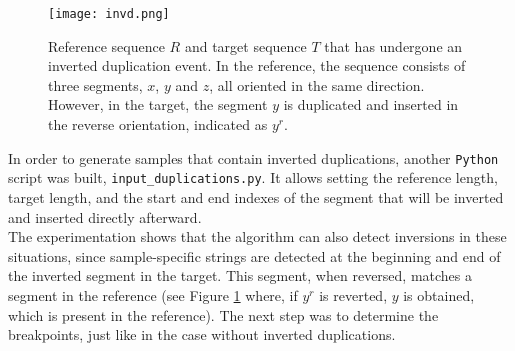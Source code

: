 \begin{figure}[h]

  \centering
    \texttt{[image: invd.png]}

  \caption{Reference sequence \( R \) and target sequence \( T \) that has undergone an inverted duplication event. In the reference, the sequence consists of three segments, \( x \), \( y \) and \( z \), all oriented in the same direction. However, in the target, the segment \( y \) is duplicated and inserted in the reverse orientation, indicated as \( y^r \).}
  \label{fig:invd}
\end{figure}

In order to generate samples that contain inverted duplications, another \texttt{Python} script was built, \texttt{input\_duplications.py}. It allows setting the reference length, target length, and the start and end indexes of the segment that will be inverted and inserted directly afterward. \\
The experimentation shows that the algorithm can also detect inversions in these situations, since sample-specific strings are detected at the beginning and end of the inverted segment in the target. This segment, when reversed, matches a segment in the reference (see Figure \ref{fig:invd} where, if \( y^r \) is reverted, \( y \) is obtained, which is present in the reference). The next step was to determine the breakpoints, just like in the case without inverted duplications.